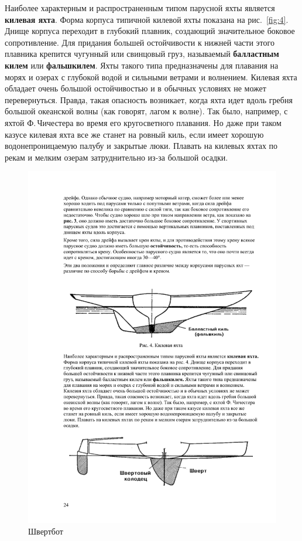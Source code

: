 \documentclass[a4paper, 12pt, twoside, final]{scrbook}
\begin{document}
Наиболее характерным и распространенным типом парусной яхты является
\textbf{килевая яхта}. Форма корпуса
типичной килевой яхты показана на рис.~\ref{fig:4}.
Днище корпуса переходит в глубокий плавник, создающий значительное
боковое сопротивление. Для придания большей остойчивости к нижней
части этого плавника крепится чугунный или свинцовый груз, называемый
\textbf{балластным килем} или
\textbf{фальшкилем}. Яхты такого типа предназначены
для плавания на морях и озерах с глубокой водой и сильными ветрами
и волнением. Килевая яхта обладает очень большой остойчивостью и в
обычных условиях не может перевернуться. Правда, такая опасность возникает,
когда яхта идет вдоль гребня большой океанской волны (как говорят,
лагом к волне). Так было, например, с яхтой Ф.\,Чичестера во время
его кругосветного плавания. Но даже при таком казусе килевая яхта
все же станет на ровный киль, если имеет хорошую водонепроницаемую
палубу и закрытые люки. Плавать на килевых яхтах по рекам и мелким
озерам затруднительно из-за большой осадки.

\begin{figure}[htbp]
\centering\includegraphics[scale=0.9]{Shvertbot}
\protect\caption{Швертбот}
\label{fig:5}
\end{figure}
\end{document}
